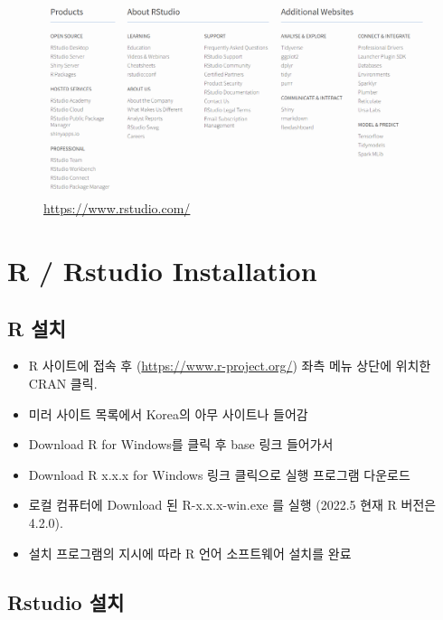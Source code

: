 \documentclass[
]{book}
\providecommand{\tightlist}{%
  \setlength{\itemsep}{0pt}\setlength{\parskip}{0pt}}
\begin{document}
\begin{figure}
\centering
\includegraphics[width=5.72917in,height=\textheight]{images/01/rstudiobottom.png}
\caption{\url{https://www.rstudio.com/}}
\end{figure}

\hypertarget{r-rstudio-installation}{%
\section{R / Rstudio Installation}\label{r-rstudio-installation}}

\hypertarget{r-uxc124uxce58}{%
\subsection{R 설치}\label{r-uxc124uxce58}}

\begin{itemize}
\tightlist
\item
  R 사이트에 접속 후 (\url{https://www.r-project.org/}) 좌측 메뉴 상단에 위치한 CRAN 클릭.
\item
  미러 사이트 목록에서 Korea의 아무 사이트나 들어감
\item
  Download R for Windows를 클릭 후 base 링크 들어가서
\item
  Download R x.x.x for Windows 링크 클릭으로 실행 프로그램 다운로드
\item
  로컬 컴퓨터에 Download 된 R-x.x.x-win.exe 를 실행 (2022.5 현재 R 버전은 4.2.0).
\item
  설치 프로그램의 지시에 따라 R 언어 소프트웨어 설치를 완료
\end{itemize}

\hypertarget{rstudio-uxc124uxce58}{%
\subsection{Rstudio 설치}\label{rstudio-uxc124uxce58}}
\end{document}
